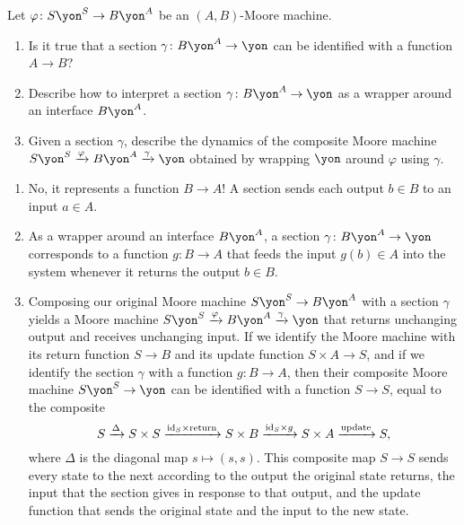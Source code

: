 \documentclass[Book-Poly]{subfiles}
\begin{document}
\begin{exercise} \label{exc.enclosures_as_functions}
Let $\varphi\colon S\yon^S\to B\yon^A$ be an $(A,B)$-Moore machine.
\begin{enumerate}
	\item Is it true that a section $\gamma\colon B\yon^A\to\yon$ can be identified with a function $A\to B$?
	\item Describe how to interpret a section $\gamma\colon B\yon^A\to\yon$ as a wrapper around an interface $B\yon^A$.
	\item Given a section $\gamma$, describe the dynamics of the composite Moore machine $S\yon^S\To{\varphi}B\yon^A\To{\gamma}\yon$ obtained by wrapping $\yon$ around $\varphi$ using $\gamma$.
\qedhere
\end{enumerate}
\begin{solution}
\begin{enumerate}
	\item No, it represents a function $B\to A$!
	A section sends each output $b\in B$ to an input $a\in A$.
	\item As a wrapper around an interface $B\yon^A$, a section $\gamma\colon B\yon^A\to\yon$ corresponds to a function $g\colon B\to A$ that feeds the input $g(b)\in A$ into the system whenever it returns the output $b\in B$.
	\item Composing our original Moore machine $S\yon^S\to B\yon^A$ with a section $\gamma$ yields a Moore machine $S\yon^S\To{\varphi}B\yon^A\To{\gamma}\yon$ that returns unchanging output and receives unchanging input.
	If we identify the Moore machine with its return function $S\to B$ and its update function $S\times A\to S$, and if we identify the section $\gamma$ with a function $g\colon B\to A$, then their composite Moore machine $S\yon^S\to\yon$ can be identified with a function $S\to S$, equal to the composite
	\[
	    S\xrightarrow{\Delta}S\times S\xrightarrow{\mathrm{id}_S\times\text{return}}S\times B\xrightarrow{\mathrm{id}_S\times g}S\times A\xrightarrow{\text{update}}S,
	\]
	where $\Delta$ is the diagonal map $s\mapsto(s,s)$.
	This composite map $S\to S$ sends every state to the next according to the output the original state returns, the input that the section gives in response to that output, and the update function that sends the original state and the input to the new state.
\end{enumerate}
\end{solution}
\end{exercise}
\end{document}
